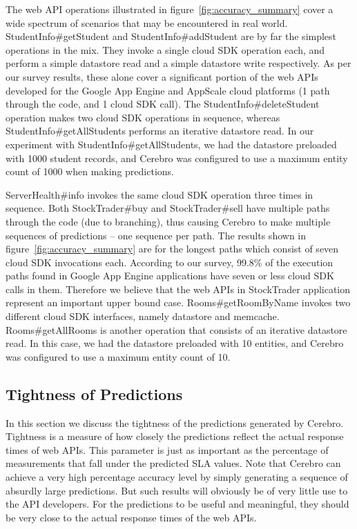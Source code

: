 The web API operations illustrated in figure~\ref{fig:accuracy_summary} cover a wide spectrum of scenarios that may be encountered
in real world. StudentInfo\#getStudent and StudentInfo\#addStudent are by far the simplest
operations in the mix. They invoke a single cloud SDK operation each, and perform a simple datastore read and a simple
datastore write respectively. As per our survey results, these alone cover a significant portion of the 
web APIs developed for the Google App Engine and AppScale cloud platforms (1 path through the code, and 1 cloud SDK call). 
The StudentInfo\#deleteStudent operation makes two cloud SDK operations in sequence, whereas
StudentInfo\#getAllStudents performs an iterative datastore read.
In our experiment with StudentInfo\#getAllStudents, we had the datastore preloaded with 1000 student records, 
and Cerebro was configured to use a maximum entity count of 1000 when making predictions.

ServerHealth\#info invokes the same cloud SDK operation three times in sequence. Both StockTrader\#buy and StockTrader\#sell have
multiple paths through the code (due to branching), thus causing Cerebro to make multiple sequences of predictions -- one sequence
per path. The results shown in figure~\ref{fig:accuracy_summary} are for the longest paths which consist of seven cloud SDK invocations each. According to
our survey, 99.8\% of the execution paths found in Google App Engine applications have seven or less cloud SDK calls in them. Therefore we believe
that the web APIs in StockTrader application represent an important upper bound case. Rooms\#getRoomByName
invokes two different cloud SDK interfaces, namely datastore and memcache. Rooms\#getAllRooms is another operation that consists of
an iterative datastore read. In this case, we had the datastore preloaded with 10 entities, and Cerebro was configured to use a maximum entity
count of 10. %

\subsection{Tightness of Predictions}
In this section we discuss the tightness of the predictions generated by Cerebro. Tightness is a measure of how closely the predictions
reflect the actual response times of web APIs. This parameter is just as important as the percentage of measurements that fall under
the predicted SLA values. Note that Cerebro can achieve a very high percentage accuracy level by simply generating a 
sequence of absurdly large predictions. But such results will obviously be of very little use to the API
developers. For the predictions to be useful and meaningful, they should be very close to the actual response times of the web APIs.

